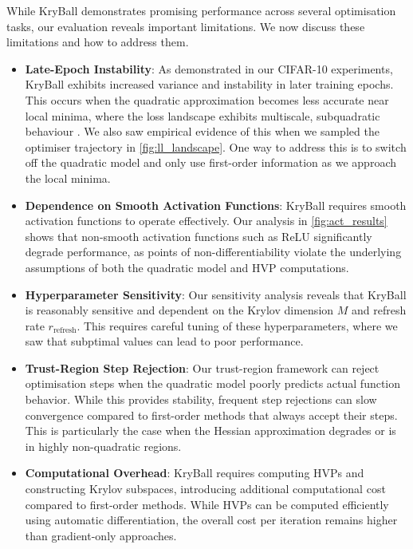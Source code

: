 While KryBall demonstrates promising performance across several optimisation tasks, our evaluation reveals important limitations. We now discuss these limitations and how to address them.

\begin{itemize}
    \item \textbf{Late-Epoch Instability}: As demonstrated in our CIFAR-10 experiments, KryBall exhibits increased variance and instability in later training epochs. This occurs when the quadratic approximation becomes less accurate near local minima, where the loss landscape exhibits multiscale, subquadratic behaviour \citep{ma2022beyond}. We also saw empirical evidence of this when we sampled the optimiser trajectory in \cref{fig:ll_landscape}. One way to address this is to switch off the quadratic model and only use first-order information as we approach the local minima. 
    
    \item \textbf{Dependence on Smooth Activation Functions}: KryBall requires smooth activation functions to operate effectively. Our analysis in \cref{fig:act_results} shows that non-smooth activation functions such as ReLU significantly degrade performance, as points of non-differentiability violate the underlying assumptions of both the quadratic model and HVP computations.
    
    \item \textbf{Hyperparameter Sensitivity}: Our sensitivity analysis reveals that KryBall is reasonably sensitive and dependent on the Krylov dimension $M$ and refresh rate $r_{\text{refresh}}$. This requires careful tuning of these hyperparameters, where we saw that subptimal values can lead to poor performance.
    
    \item \textbf{Trust-Region Step Rejection}: Our trust-region framework can reject optimisation steps when the quadratic model poorly predicts actual function behavior. While this provides stability, frequent step rejections can slow convergence compared to first-order methods that always accept their steps. This is particularly the case when the Hessian approximation degrades or is in highly non-quadratic regions.
    
    \item \textbf{Computational Overhead}: KryBall requires computing HVPs and constructing Krylov subspaces, introducing additional computational cost compared to first-order methods. While HVPs can be computed efficiently using automatic differentiation, the overall cost per iteration remains higher than gradient-only approaches.
\end{itemize}

